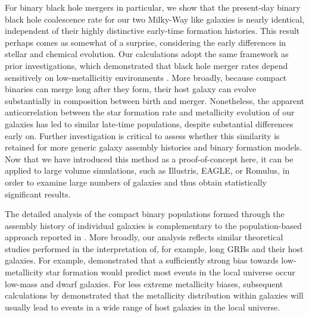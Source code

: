 \documentclass[nofootinbib,twocolumn,prd]{emulateapj}
\newcommand\jillianremark[1]{{\color{blue}#1}}
\begin{document}
For binary black hole mergers in particular, we show that the present-day binary black hole coalescence rate for our two
Milky-Way like galaxies is nearly identical, independent of their highly distinctive early-time formation histories.   
This result perhaps comes as somewhat of a surprise, considering the early differences in stellar and chemical evolution.
Our calculations adopt the same framework as  prior investigations, which demonstrated 
that black hole merger rates depend sensitively on low-metallicitiy environments
\citep[see,e.g.][]{PSellipticals,popsyn-LowMetallicityImpact2b-StarTrackRevised-2013,gwastro-EventPopsynPaper-2016}.   More broadly,
because compact binaries can merge long after they form, their host galaxy can evolve substantially in composition
between birth and merger.
Nonetheless, the apparent anticorrelation between the star formation rate and metallicity evolution of our galaxies has
led to similar late-time populations, despite substantial differences early on.
%
Further investigation is critical to assess whether this similarity is retained for more generic galaxy assembly
histories and binary formation models.    Now that we have introduced this method as a proof-of-concept here, it can be applied to large volume simulations, such as Illustris, EAGLE, or Romulus, in order to examine large numbers of galaxies and thus obtain statistically significant results.

The detailed analysis of the compact binary populations formed through the assembly history of individual galaxies is
complementary to the  population-based approach reported in
\cite{2016arXiv160508783L}.     More broadly, our analysis reflects  similar theoretical studies performed in the interpretation of, for
example, long GRBs and their host galaxies. 
For example, \cite{2009ApJ...702..377K} demonstrated that a sufficiently strong bias towards low-metallicity star formation would predict
most  events in the local universe occur low-mass and dwarf galaxies.
For less extreme metallicity biases, subsequent calculations by  \citet{2011MNRAS.417..567N} demonstrated that the
metallicity distribution within galaxies will usually lead to events in a wide range of host galaxies in the local universe.
\end{document}
